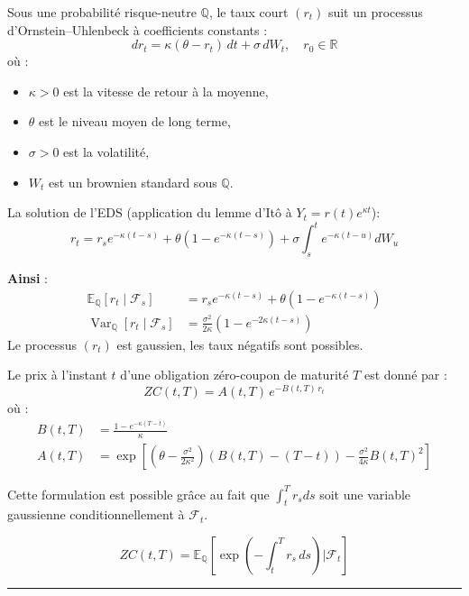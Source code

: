 \begin{f}
	
	Sous une probabilité risque-neutre \(\mathbb{Q}\), le taux court \((r_t)\) suit un processus d’Ornstein–Uhlenbeck à coefficients constants :
	\[
	dr_t = \kappa(\theta - r_t)\, dt + \sigma\, dW_t, \quad r_0 \in \mathbb{R}
	\]
	où :
	\begin{itemize}[nosep]
		\item \(\kappa > 0\) est la vitesse de retour à la moyenne,
		\item \(\theta\) est le niveau moyen de long terme,
		\item \(\sigma > 0\) est la volatilité,
		\item \(W_t\) est un brownien standard sous \(\mathbb{Q}\).
	\end{itemize}
	
La solution de l’EDS (application du lemme d'Itô à \(Y_{t}=r(t) e^{\kappa t}\)):
	\[
	r_t = r_s e^{-\kappa(t-s)} + \theta(1 - e^{-\kappa(t-s)}) + \sigma \int_s^t e^{-\kappa(t-u)} dW_u
	\]
	
	\textbf{Ainsi} :
	\[
	\begin{aligned}
		\mathbb{E}_\mathbb{Q}[r_t \mid \mathcal{F}_s] &= r_s e^{-\kappa(t-s)} + \theta(1 - e^{-\kappa(t-s)}) \\
		\operatorname{Var}_\mathbb{Q}[r_t \mid \mathcal{F}_s] &= \frac{\sigma^2}{2\kappa} \left(1 - e^{-2\kappa(t-s)}\right)
	\end{aligned}
	\]
Le processus \((r_t)\) est gaussien, les taux négatifs sont possibles.
	
\end{f}

\begin{f}

Le prix à l’instant \(t\) d’une obligation zéro-coupon de maturité \(T\) est donné par :
\[
ZC(t, T) = A(t, T) \, e^{-B(t, T)\, r_t}
\]
où :
\[
\begin{aligned}
	B(t, T) &= \frac{1 - e^{-\kappa(T - t)}}{\kappa} \\
	A(t, T) &= \exp \left[ \left(\theta - \frac{\sigma^2}{2\kappa^2}\right) (B(t, T) - (T - t)) - \frac{\sigma^2}{4\kappa} B(t, T)^2 \right]
\end{aligned}
\]

Cette formulation est possible grâce au fait que \(\int_t^T r_s ds\) soit une variable gaussienne conditionnellement à \(\mathcal{F}_t\).

\[
ZC(t, T) = \mathbb{E}_\mathbb{Q} \left[ \exp\left( -\int_t^T r_s\, ds \right) \Big| \mathcal{F}_t \right]
\]

\end{f}
\hrule

